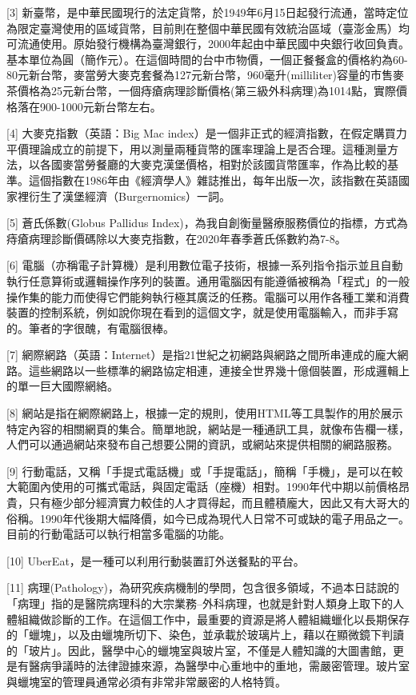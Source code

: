 \documentclass[a5paper, 11pt
]{book}
\begin{document}
{[}3{]}
新臺幣，是中華民國現行的法定貨幣，於1949年6月15日起發行流通，當時定位為限定臺灣使用的區域貨幣，目前則在整個中華民國有效統治區域（臺澎金馬）均可流通使用。原始發行機構為臺灣銀行，2000年起由中華民國中央銀行收回負責。基本單位為圓（簡作元）。在這個時間的台中市物價，一個正餐餐盒的價格約為60-80元新台幣，麥當勞大麥克套餐為127元新台幣，960毫升(milliliter)容量的市售麥茶價格為25元新台幣，一個痔瘡病理診斷價格(第三級外科病理)為1014點，實際價格落在900-1000元新台幣左右。

{[}4{]} 大麥克指數（英語：Big Mac
index）是一個非正式的經濟指數，在假定購買力平價理論成立的前提下，用以測量兩種貨幣的匯率理論上是否合理。這種測量方法，以各國麥當勞餐廳的大麥克漢堡價格，相對於該國貨幣匯率，作為比較的基準。這個指數在1986年由《經濟學人》雜誌推出，每年出版一次，該指數在英語國家裡衍生了漢堡經濟（Burgernomics）一詞。

{[}5{]} 蒼氏係數(Globus Pallidus
Index)，為我自創衡量醫療服務價位的指標，方式為痔瘡病理診斷價碼除以大麥克指數，在2020年春季蒼氏係數約為7-8。

{[}6{]}
電腦（亦稱電子計算機）是利用數位電子技術，根據一系列指令指示並且自動執行任意算術或邏輯操作序列的裝置。通用電腦因有能遵循被稱為「程式」的一般操作集的能力而使得它們能夠執行極其廣泛的任務。電腦可以用作各種工業和消費裝置的控制系統，例如說你現在看到的這個文字，就是使用電腦輸入，而非手寫的。筆者的字很醜，有電腦很棒。

{[}7{]}
網際網路（英語：Internet）是指21世紀之初網路與網路之間所串連成的龐大網路。這些網路以一些標準的網路協定相連，連接全世界幾十億個裝置，形成邏輯上的單一巨大國際網絡。

{[}8{]}
網站是指在網際網路上，根據一定的規則，使用HTML等工具製作的用於展示特定內容的相關網頁的集合。簡單地說，網站是一種通訊工具，就像布告欄一樣，人們可以通過網站來發布自己想要公開的資訊，或網站來提供相關的網路服務。

{[}9{]}
行動電話，又稱「手提式電話機」或「手提電話」，簡稱「手機」，是可以在較大範圍內使用的可攜式電話，與固定電話（座機）相對。1990年代中期以前價格昂貴，只有極少部分經濟實力較佳的人才買得起，而且體積龐大，因此又有大哥大的俗稱。1990年代後期大幅降價，如今已成為現代人日常不可或缺的電子用品之一。目前的行動電話可以執行相當多電腦的功能。

{[}10{]} UberEat，是一種可以利用行動裝置訂外送餐點的平台。

{[}11{]}
病理(Pathology)，為研究疾病機制的學問，包含很多領域，不過本日誌說的「病理」指的是醫院病理科的大宗業務--外科病理，也就是針對人類身上取下的人體組織做診斷的工作。在這個工作中，最重要的資源是將人體組織蠟化以長期保存的「蠟塊」，以及由蠟塊所切下、染色，並承載於玻璃片上，藉以在顯微鏡下判讀的「玻片」。因此，醫學中心的蠟塊室與玻片室，不僅是人體知識的大圖書館，更是有醫病爭議時的法律證據來源，為醫學中心重地中的重地，需嚴密管理。玻片室與蠟塊室的管理員通常必須有非常非常嚴密的人格特質。
\end{document}

